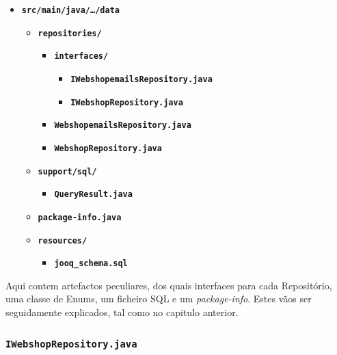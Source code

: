 \begin{itemize}
        \item \texttt{\textbf{src/main/java/\ldots/data}}\begin{itemize}
                      \item \texttt{\textbf{repositories/}}\begin{itemize}
                                    \item \texttt{\textbf{interfaces/}}\begin{itemize}
                                                  \item \texttt{\textbf{IWebshopemailsRepository.java}}
                                                  \item \texttt{\textbf{IWebshopRepository.java}}
                                          \end{itemize}
                                    \item \texttt{\textbf{WebshopemailsRepository.java}}
                                    \item \texttt{\textbf{WebshopRepository.java}}
                            \end{itemize}
                      \item \texttt{\textbf{support/sql/}}\begin{itemize}
                                    \item \texttt{\textbf{QueryResult.java}}
                            \end{itemize}
                      \item \texttt{\textbf{package-info.java}}
                      \item \texttt{\textbf{resources/}}\begin{itemize}
                                    \item \texttt{\textbf{jooq\_schema.sql}}
                            \end{itemize}
              \end{itemize}
\end{itemize}

Aqui contem artefactos peculiares, dos quais interfaces para cada Repositório, uma classe de Enums, um ficheiro SQL e um \textit{package-info}. Estes vãos ser seguidamente explicados, tal como no capitulo anterior.

\newpage

\subsubsection*{\texttt{IWebshopRepository.java}}

